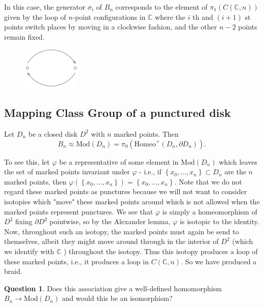 \documentclass[reqno]{amsart}
\theoremstyle{definition}
\newtheorem{question}[theorem]{Question}
\theoremstyle{remark}
\newcommand{\Mod}{{\mathrm{Mod}}}
\newcommand{\Homeo}{{\mathrm{Homeo}}}
\begin{document}
In this case, the generator 
$\sigma_i$ of $B_n$ corresponds to the element
of $\pi_1 \left( C \left( \mathbb{C},n \right)  \right) $ 
given by the loop of $n$-point configurations in
$\mathbb{C}$ where the $i$ th and $\left( i+1 \right) $ st
points switch places by moving in a clockwise fashion,
and the other $n-2$ points remain fixed.

\begin{figure}[htpb]
    \centering
    \includegraphics[width=0.25\textwidth]{sigma_i_configuration.png}
    \label{fig:sigma_i_configuration-png}
\end{figure}


\subsection{Mapping Class Group of a punctured disk}

Let $D_n$ be a closed disk $D^2$ with $n$ marked points.
Then
\[
B_n \approx \Mod\left( D_n \right) =
\pi_0 \left( \Homeo^{+} \left( D_n, \partial D_n \right)  \right).
\] 

To see this, let $\varphi$ be a representative
of some element in $\Mod \left( D_n \right) $ which
leaves the set of marked points invariant under
$\varphi$ - i.e., if $\left\{ x_0, \ldots,x_n \right\} 
\subset D_n$ are the $n$ marked points, then
$\varphi \left( \left\{ x_0, \ldots,x_n \right\}  \right) 
= \left\{ x_0, \ldots, x_n \right\} $. Note that we
do not regard these marked points as punctures because
we will not want to consider isotopies which "move" these
marked points around which is not allowed when the marked points
represent punctures.
We see that
$\varphi $ is simply a homeomorphism of $D^2$ fixing
$\partial D^2$ pointwise, so by the Alexander
lemma, $\varphi $ is isotopic to the identity. Now, throughout
such an isotopy, the marked points must again be send to
themselves, albeit they might move around through
in the interior of $D^2 $ (which we identify with
$\mathbb{C}$ ) throughout the isotopy. Thus
this isotopy produces a loop of these marked points,
i.e., it produces a loop in $C \left( \mathbb{C},n \right) $.
So we have produced a braid.

\begin{question}\label{question-1}
    Does this association give a well-defined homomorphism
    $B_n \to \Mod(D_n) $ and would this be an isomorphism?
\end{question}
\end{document}
